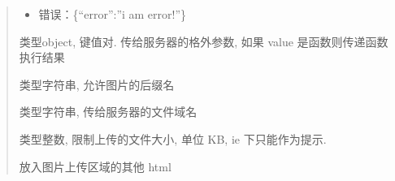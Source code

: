 \documentclass[letterpaper,10pt,english]{sphinxmanual}
\begin{document}
\begin{fulllineitems}
\begin{fulllineitems}
\begin{quote}
\begin{fulllineitems}
\begin{itemize}
\item {}
错误：\{``error'':''i am error!''\}

\end{itemize}

\end{fulllineitems}



\begin{fulllineitems}
\label{relatedproj/editorguide/plugin-config:Editor.pluginConfig.image.upload.serverParams}
类型object, 键值对. 传给服务器的格外参数, 如果 value 是函数则传递函数执行结果

\end{fulllineitems}



\begin{fulllineitems}
\label{relatedproj/editorguide/plugin-config:Editor.pluginConfig.image.upload.suffix}
类型字符串, 允许图片的后缀名

\end{fulllineitems}



\begin{fulllineitems}
\label{relatedproj/editorguide/plugin-config:Editor.pluginConfig.image.upload.fileInput}
类型字符串, 传给服务器的文件域名

\end{fulllineitems}



\begin{fulllineitems}
\label{relatedproj/editorguide/plugin-config:Editor.pluginConfig.image.upload.sizeLimit}
类型整数, 限制上传的文件大小, 单位 KB, ie 下只能作为提示.

\end{fulllineitems}



\begin{fulllineitems}
\label{relatedproj/editorguide/plugin-config:Editor.pluginConfig.image.upload.extraHtml}
放入图片上传区域的其他 html


\end{fulllineitems}
\end{quote}
\end{fulllineitems}
\end{fulllineitems}
\end{document}

